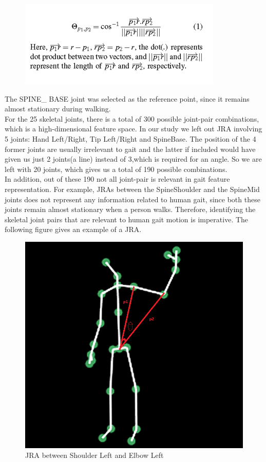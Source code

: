 \begin{figure}[h]
\centering
\includegraphics[scale=0.9]{equation.png}

\end{figure}
\noindent The SPINE\_ BASE joint was selected as the reference point, since it remains almost stationary during walking.\\                                           For the 25 skeletal joints, there is a total of 300 possible joint-pair combinations, which is a high-dimensional feature space. In our study we left out JRA involving 5 joints:  Hand Left/Right, Tip Left/Right and SpineBase. The position of the 4 former joints are usually irrelevant to gait and the latter if included would have given us just 2 joints(a line) instead of 3,which is required for an angle. So we are left with 20 joints, which gives us a total of 190 possible combinations.\\
In addition, out of these 190 not all joint-pair is relevant in gait feature representation. For example, JRAs between the SpineShoulder and the SpineMid joints does not represent any information related to human gait, since both these joints remain almost stationary when a person walks. Therefore, identifying the skeletal joint pairs that are relevant to human gait motion is imperative. The following figure gives an example of a JRA. \\
\begin{figure}[h]
\centering
\includegraphics[scale=0.5]{angle.png}
\caption{JRA between Shoulder Left and Elbow Left}
\end{figure}


